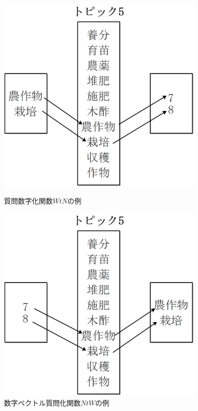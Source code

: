 \documentclass[master]{suribt}
\theoremstyle{definition}
\begin{document}
 \begin{figure}
 \begin{minipage}[t]{0.5\linewidth}
 \centering
 \includegraphics[width=0.9\textwidth,natwidth=310,natheight=299]{tv1.png}
 \caption{質問数字化関数$WtN$の例}
 \label{fig:tv1}
 \end{minipage}%
 \begin{minipage}[t]{0.5\linewidth}
 \centering
 \includegraphics[width=0.9\textwidth,natwidth=310,natheight=299]{tv2.png}
 \caption{数字ベクトル質問化関数$NtW$の例}
 \label{fig:tv2}
 \end{minipage}
 \end{figure}
\end{document}
